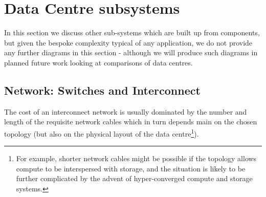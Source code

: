 \documentclass{../../template/esiwace-report}
\begin{document}
%
%
%




\section{Data Centre subsystems}
\label{sec:modeling/subsystems}

In this section we discuss other sub-systems which are built up from components, but given the bespoke complexity typical of any application, we do not provide any further diagrams in this section - although we will produce such diagrams in planned future work looking at comparisons of data centres.

\subsection{Network: Switches and Interconnect}


The cost of an interconnect network is usually dominated by the number and length of the requisite network cables which in turn depends main on the chosen topology (but also on the physical layout of the data centre\footnote{For example, shorter network cables might be possible if the topology allows compute to be interspersed with storage, and the situation is likely to be further complicated by the advent of hyper-converged compute and storage systems.}).
\end{document}
